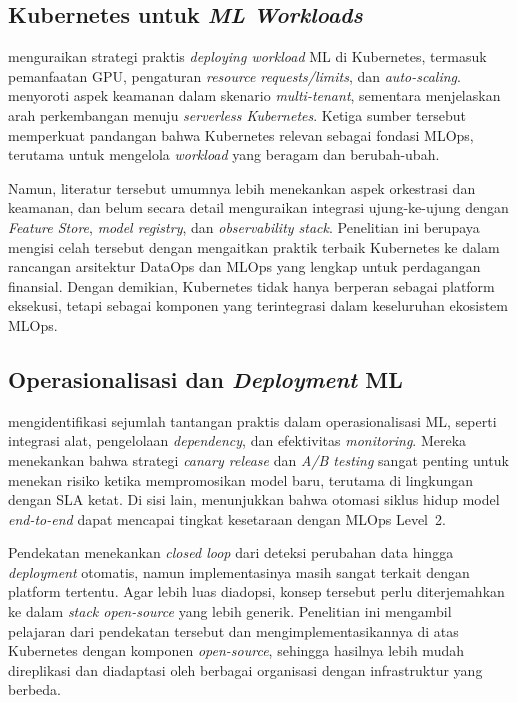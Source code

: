\subsection{Kubernetes untuk \textit{ML Workloads}}

\textcite{lakka2025kubernetes} menguraikan strategi praktis \textit{deploying workload} ML di Kubernetes, termasuk pemanfaatan GPU, pengaturan \textit{resource requests/limits}, dan \textit{auto-scaling}. \textcite{ahmad2024mlops} menyoroti aspek keamanan dalam skenario \textit{multi-tenant}, sementara \textcite{adusumilli2025serverless} menjelaskan arah perkembangan menuju \textit{serverless Kubernetes}. Ketiga sumber tersebut memperkuat pandangan bahwa Kubernetes relevan sebagai fondasi MLOps, terutama untuk mengelola \textit{workload} yang beragam dan berubah-ubah.

Namun, literatur tersebut umumnya lebih menekankan aspek orkestrasi dan keamanan, dan belum secara detail menguraikan integrasi ujung-ke-ujung dengan \textit{Feature Store}, \textit{model registry}, dan \textit{observability stack}. Penelitian ini berupaya mengisi celah tersebut dengan mengaitkan praktik terbaik Kubernetes ke dalam rancangan arsitektur DataOps dan MLOps yang lengkap untuk perdagangan finansial. Dengan demikian, Kubernetes tidak hanya berperan sebagai platform eksekusi, tetapi sebagai komponen yang terintegrasi dalam keseluruhan ekosistem MLOps.

\subsection{Operasionalisasi dan \textit{Deployment} ML}

\textcite{shankar2022operationalizing} mengidentifikasi sejumlah tantangan praktis dalam operasionalisasi ML, seperti integrasi alat, pengelolaan \textit{dependency}, dan efektivitas \textit{monitoring}. Mereka menekankan bahwa strategi \textit{canary release} dan \textit{A/B testing} sangat penting untuk menekan risiko ketika mempromosikan model baru, terutama di lingkungan dengan SLA ketat. Di sisi lain, \textcite{hsu2024endtoend} menunjukkan bahwa otomasi siklus hidup model \textit{end-to-end} dapat mencapai tingkat kesetaraan dengan MLOps Level~2.

Pendekatan \textcite{hsu2024endtoend} menekankan \textit{closed loop} dari deteksi perubahan data hingga \textit{deployment} otomatis, namun implementasinya masih sangat terkait dengan platform tertentu. Agar lebih luas diadopsi, konsep tersebut perlu diterjemahkan ke dalam \textit{stack open-source} yang lebih generik. Penelitian ini mengambil pelajaran dari pendekatan tersebut dan mengimplementasikannya di atas Kubernetes dengan komponen \textit{open-source}, sehingga hasilnya lebih mudah direplikasi dan diadaptasi oleh berbagai organisasi dengan infrastruktur yang berbeda.

